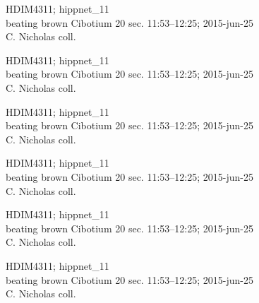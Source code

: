 \documentclass[2pt]{extarticle}
\begin{document}
\noindent
\parbox{0.16\textwidth}{\tiny \raggedright \rule[-0.3\baselineskip]{0pt}{10pt}HDIM4311; hippnet\_11\\ beating brown Cibotium 20 sec. 11:53--12:25; 2015-jun-25\\ C. Nicholas coll.}
\parbox{0.16\textwidth}{\tiny \raggedright \rule[-0.3\baselineskip]{0pt}{10pt}HDIM4311; hippnet\_11\\ beating brown Cibotium 20 sec. 11:53--12:25; 2015-jun-25\\ C. Nicholas coll.}
\parbox{0.16\textwidth}{\tiny \raggedright \rule[-0.3\baselineskip]{0pt}{10pt}HDIM4311; hippnet\_11\\ beating brown Cibotium 20 sec. 11:53--12:25; 2015-jun-25\\ C. Nicholas coll.}
\parbox{0.16\textwidth}{\tiny \raggedright \rule[-0.3\baselineskip]{0pt}{10pt}HDIM4311; hippnet\_11\\ beating brown Cibotium 20 sec. 11:53--12:25; 2015-jun-25\\ C. Nicholas coll.}
\parbox{0.16\textwidth}{\tiny \raggedright \rule[-0.3\baselineskip]{0pt}{10pt}HDIM4311; hippnet\_11\\ beating brown Cibotium 20 sec. 11:53--12:25; 2015-jun-25\\ C. Nicholas coll.}
\parbox{0.16\textwidth}{\tiny \raggedright \rule[-0.3\baselineskip]{0pt}{10pt}HDIM4311; hippnet\_11\\ beating brown Cibotium 20 sec. 11:53--12:25; 2015-jun-25\\ C. Nicholas coll.} \\ 
\vspace{0.001in} 
\end{document}
